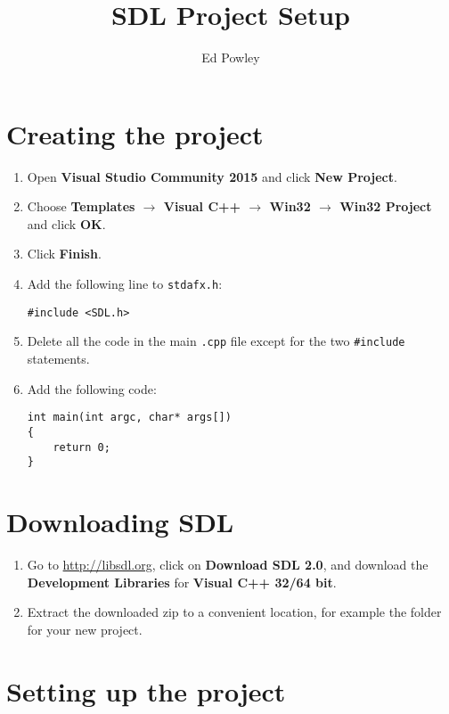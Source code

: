 \documentclass[a4paper]{article}
\title{SDL Project Setup}
\author{Ed Powley}
\begin{document}
\maketitle

\section{Creating the project}

\begin{enumerate}
    \item Open \textbf{Visual Studio Community 2015} and click \textbf{New Project}.
    \item Choose \textbf{Templates $\to$ Visual C++ $\to$ Win32 $\to$ Win32 Project} and click \textbf{OK}.
    \item Click \textbf{Finish}.
    \item Add the following line to \texttt{stdafx.h}:
    \begin{lstlisting}
#include <SDL.h>
    \end{lstlisting}
    \item Delete all the code in the main \texttt{.cpp} file except for the two \texttt{\#include} statements.
    \item Add the following code:
    \begin{lstlisting}
int main(int argc, char* args[])
{
	return 0;
}
    \end{lstlisting}
\end{enumerate}

\section{Downloading SDL}

\begin{enumerate}
    \item Go to \url{http://libsdl.org}, click on \textbf{Download SDL 2.0},
        and download the \textbf{Development Libraries} for \textbf{Visual C++ 32/64 bit}.
    \item Extract the downloaded zip to a convenient location, for example the folder for your new project.
\end{enumerate}

\section{Setting up the project}
\end{document}
